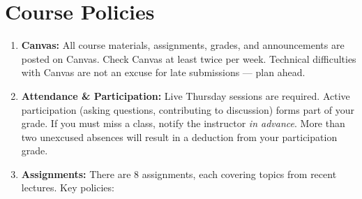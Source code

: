 \documentclass[
  10pt,
]{article}
\begin{document}
\section*{Course Policies}\label{course-policies}

\begin{enumerate}
\def\labelenumi{\arabic{enumi}.}
\item
  \textbf{Canvas:} All course materials, assignments, grades, and
  announcements are posted on Canvas. Check Canvas at least twice per
  week. Technical difficulties with Canvas are not an excuse for late
  submissions --- plan ahead.
\item
  \textbf{Attendance \& Participation:} Live Thursday sessions are
  required. Active participation (asking questions, contributing to
  discussion) forms part of your grade. If you must miss a class, notify
  the instructor \emph{in advance}. More than two unexcused absences
  will result in a deduction from your participation grade.
\item
  \textbf{Assignments:} There are 8 assignments, each covering topics
  from recent lectures. Key policies:


\end{enumerate}
\end{document}
